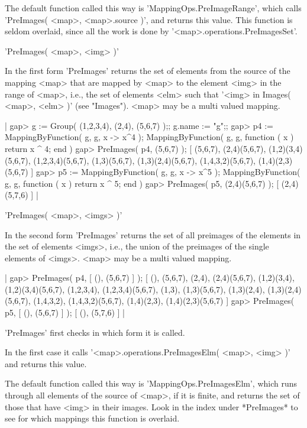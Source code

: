 The default function called this way is 'MappingOps.PreImageRange', which
calls 'PreImages( <map>, <map>.source  )',  and returns this value.  This
function  is   seldom  overlaid,   since   all  the   work  is  done   by
'<map>.operations.PreImagesSet'.


'PreImages( <map>, <img> )'

In the first form 'PreImages' returns the set of elements from the source
of the mapping <map> that are mapped by <map> to the element <img> in the
range  of <map>,  i.e.,  the set of elements  <elm> such  that  '<img> in
Images(  <map>, <elm>  )' (see "Images").  <map> may  be  a  multi valued
mapping.

|    gap> g := Group( (1,2,3,4), (2,4), (5,6,7) );;  g.name := "g";;
    gap> p4 := MappingByFunction( g, g, x -> x^4 );
    MappingByFunction( g, g, function ( x )
        return x ^ 4;
    end )
    gap> PreImages( p4, (5,6,7) );
    [ (5,6,7), (2,4)(5,6,7), (1,2)(3,4)(5,6,7), (1,2,3,4)(5,6,7), 
      (1,3)(5,6,7), (1,3)(2,4)(5,6,7), (1,4,3,2)(5,6,7), 
      (1,4)(2,3)(5,6,7) ]
    gap> p5 := MappingByFunction( g, g, x -> x^5 );
    MappingByFunction( g, g, function ( x )
        return x ^ 5;
    end )
    gap> PreImages( p5, (2,4)(5,6,7) );
    [ (2,4)(5,7,6) ] |

'PreImages( <map>, <imgs> )'

In the  second form 'PreImages' returns  the set of all  preimages of the
elements in the set of elements <imgs>, i.e., the  union of the preimages
of the single elements of <imgs>.  <map> may be a multi valued mapping.

|    gap> PreImages( p4, [ (), (5,6,7) ] );
    [ (), (5,6,7), (2,4), (2,4)(5,6,7), (1,2)(3,4), (1,2)(3,4)(5,6,7), 
      (1,2,3,4), (1,2,3,4)(5,6,7), (1,3), (1,3)(5,6,7), (1,3)(2,4), 
      (1,3)(2,4)(5,6,7), (1,4,3,2), (1,4,3,2)(5,6,7), (1,4)(2,3), 
      (1,4)(2,3)(5,6,7) ]
    gap> PreImages( p5, [ (), (5,6,7) ] );
    [ (), (5,7,6) ] |

'PreImages' first checks in which form it is called.

In the first  case it calls  '<map>.operations.PreImagesElm( <map>, <img>
)' and returns this value.

The default function called this  way is 'MappingOps.PreImagesElm', which
runs  through all elements of  the source of <map>, if it is  finite, and
returns the set of those that have <img> in  their images.   Look  in the
index under  *PreImages*  to see  for  which  mappings  this  function is
overlaid.

